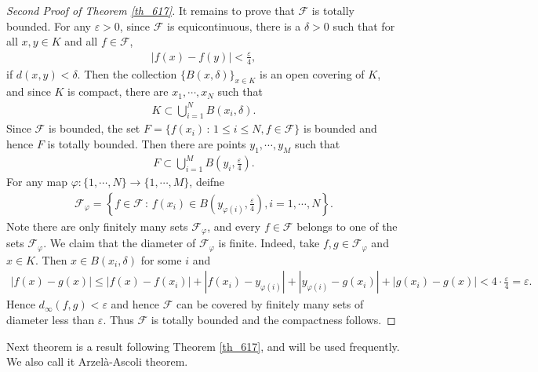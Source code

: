 \documentclass[11pt]{book}
\theoremstyle{definition}
\numberwithin{equation}{chapter}
\begin{document}
\begin{proof}[Second Proof of Theorem \ref{th_617}]
It remains to prove that $\mathcal{F}$ is totally bounded. For any $\varepsilon > 0$, since $\mathcal{F}$ is equicontinuous, there is a $\delta > 0$ such that for all $x,y \in K$ and all $f \in \mathcal{F}$, 
\begin{align*}
    \left|f(x) - f(y)\right| < \frac{\varepsilon}{4},
\end{align*}
if $d(x,y) < \delta$. Then the collection $\{B(x,\delta)\}_{x \in K}$ is an open covering of $K$, and since $K$ is compact, there are $x_1, \cdots, x_N$ such that
\begin{align*}
    K \subset \bigcup^N_{i=1} B(x_i,\delta).
\end{align*}
Since $\mathcal{F}$ is bounded, the set $F = \{f(x_i) \,:\, 1 \leq i \leq N, f \in \mathcal{F}\}$ is bounded and hence $F$ is totally bounded. Then there are points $y_1, \cdots, y_M$ such that
\begin{align*}
    F \subset \bigcup^M_{i=1} B\left(y_i, \frac{\varepsilon}{4}\right).
\end{align*}
For any map $\varphi: \{1,\cdots,N\} \to \{1,\cdots,M\}$, deifne
\begin{align*}
    \mathcal{F}_{\varphi} = \left\{f \in \mathcal{F} \,:\, f(x_i) \in B\left(y_{\varphi(i)}, \frac{\varepsilon}{4}\right), i = 1,\cdots,N \right\}.
\end{align*}
Note there are only finitely many sets $\mathcal{F}_{\varphi}$, and every $f \in \mathcal{F}$ belongs to one of the sets $\mathcal{F}_{\varphi}$. We claim that the diameter of $\mathcal{F}_{\varphi}$ is finite. Indeed, take $f, g \in \mathcal{F}_{\varphi}$ and $x \in K$. Then $x \in B(x_i,\delta)$ for some $i$ and 
\begin{align*}
    \left|f(x) - g(x)\right| \leq \left|f(x) - f(x_i)\right| + \left|f(x_i) - y_{\varphi(i)}\right| + \left|y_{\varphi(i)} - g(x_i)\right| + \left|g(x_i) - g(x)\right| < 4 \cdot \frac{\varepsilon}{4} = \varepsilon.
\end{align*}
Hence $d_{\infty}(f,g) < \varepsilon$ and hence $\mathcal{F}$ can be covered by finitely many sets of diameter less than $\varepsilon$. Thus $\mathcal{F}$ is totally bounded and the compactness follows.
\end{proof}

\medskip

Next theorem is a result following Theorem \ref{th_617}, and will be used frequently. We also call it Arzelà-Ascoli theorem.

\medskip
\end{document}
